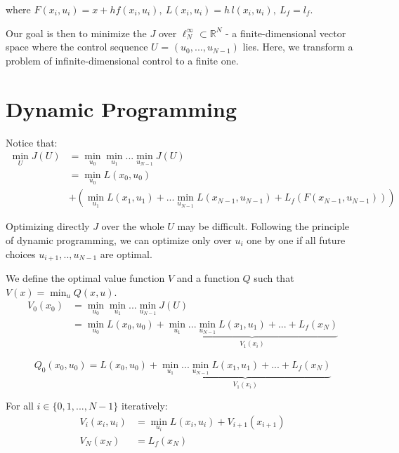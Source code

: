 \documentclass{report}
\begin{document}
where $F(x_i, u_i) = x + h f(x_i, u_i), \ L(x_i, u_i) =h\,l(x_i, u_i), \ L_f = l_f $.

\medskip

Our goal is then to minimize the $J$ over $\ell_N^\infty \subset \mathbb{R}^N$ - a finite-dimensional vector space where the control sequence $U$ = $(u_0, ..., u_{N-1})$ lies. Here, we transform a problem of infinite-dimensional control to a finite one.

\section{Dynamic Programming}
Notice that:
\begin{equation}
\begin{split}
\min_{U} J(U) &= \min_{u_0} \min_{u_1} ... \min_{u_{N-1}} J(U) \\
					 &= \min_{u_0} L(x_0, u_0)  \\
					 &+ (\min_{u_1} L(x_1, u_1) +... \min_{u_{N-1}}L(x_{N-1}, u_{N-1}) + L_f(F(x_{N-1}, u_{N-1})))
\end{split}
\end{equation}

Optimizing directly $J$ over the whole $U$ may be difficult. Following the principle of dynamic programming, we can optimize only over $u_i$ one by one if all future choices $u_{i+1}, .., u_{N-1}$ are optimal. 

\medskip
We define the optimal value function $V$ and a function $Q$ such that $V(x) = \min_{u} Q(x, u)$.
\begin{equation}
\begin{split}
V_0(x_0) &= \min_{u_0} \min_{u_1} ... \min_{u_{N-1}} J(U) \\
			&= \min_{u_0} L(x_0, u_0)  + \underbrace{\min_{u_1} ... \min_{u_{N-1}} L(x_1, u_1)+... +L_f(x_N)}_{V_1(x_i)}
\end{split}
\end{equation}


\begin{equation}
Q_0(x_0, u_0) =L(x_0, u_0)  +\underbrace{\min_{u_1} ... \min_{u_{N-1}} L(x_1, u_1)+... +L_f(x_N)}_{V_1(x_i)}
\end{equation}


\medskip

For all  $i\in \{0, 1, ..., N-1\}$ iteratively:
\begin{equation}
\begin{split}
V_i(x_i,u_i) &= \min_{u_i}L(x_i,u_i) + V_{i+1}(x_{i+1}) \\
		V_N(x_N) &= L_f(x_N)
\end{split}
\end{equation}
\end{document}
